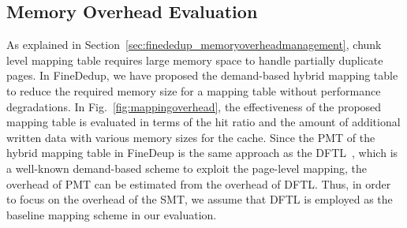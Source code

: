 \subsection{Memory Overhead Evaluation}
\label{sec:finededup_memoryoverheadevaluation}

As explained in Section~\ref{sec:finededup_memoryoverheadmanagement},
chunk level mapping table requires large memory space to handle partially duplicate pages.
In FineDedup, we have proposed 
the demand-based hybrid mapping table to reduce the required memory size for a mapping table without performance degradations.
In Fig.~\ref{fig:mappingoverhead}, the effectiveness of the proposed mapping table is evaluated in terms of the hit ratio and 
the amount of additional written data with various memory sizes for the cache.
Since the PMT of the hybrid mapping table in FineDeup is the same approach as the DFTL~\cite{dftl}, which is a well-known 
demand-based scheme to exploit the page-level mapping,
the overhead of PMT can be estimated from the overhead of DFTL.
Thus, in order to focus on the overhead of the SMT, we assume that DFTL is employed as the baseline mapping scheme in our evaluation.

